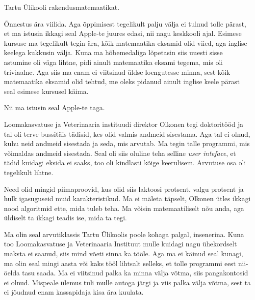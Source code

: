 
Tartu Ülikooli rakendusmatemaatikat. 


Õnnestus ära viilida. Aga õppimisest tegelikult palju välja ei tulnud 
tolle pärast, et ma istusin ikkagi seal Apple-te juures edasi, nii nagu 
keskkooli ajal. Esimese kursuse ma tegelikult tegin ära, kõik matemaatika 
eksamid olid viied, aga inglise keelega kukkusin välja. Kuna ma hõbemedaliga 
lõpetasin  siis uuesti sisse astumine oli väga lihtne, pidi ainult matemaatika 
eksami tegema, mis oli triviaalne. Aga siis ma enam ei viitsinud üldse 
loengutesse minna, sest  kõik matemaatika eksamid olid tehtud, me oleks pidanud 
ainult inglise keele pärast seal esimese kursusel käima.

Nii ma istusin seal Apple-te taga. 

Loomakasvatuse ja Veterinaaria instituudi direktor Olkonen tegi 
doktoritööd ja tal oli terve bussitäis tädisid, kes olid valmis andmeid 
sisestama. Aga tal ei olnud, kuhu neid andmeid sisestada ja seda, mis arvutab. 
Ma tegin talle  programmi, mis võimaldas andmeid sisestada. Seal oli siis 
oluline teha selline \emph{user inteface}, et tädid kuidagi eksida ei 
saaks, too oli kindlasti kõige keerulisem. Arvutuse osa oli  tegelikult 
lihtne.


Need olid mingid piimaproovid, kus olid siis laktoosi protsent, valgu protsent ja hulk 
igasuguseid muid karakteristikud.  Ma ei mäleta täpselt, Olkonen ütles ikkagi 
nood algoritmid ette, mida tuleb teha. Ma võisin matemaatiliselt nõu anda, aga  
üldiselt ta ikkagi teadis ise, mida ta tegi. 


Ma olin seal arvutiklassis Tartu Ülikoolis poole kohaga palgal,  insenerina. 
Kuna too Loomakasvatuse ja Veterinaaria Instituut mulle kuidagi nagu 
ühekordselt maksta ei saanud, siis mind võeti sinna ka tööle. Aga ma ei käinud 
seal kunagi, ma olin seal mingi aasta või kaks tööl lihtsalt selleks, et tolle 
programmi eest nii-öelda tasu saada. Ma ei viitsinud palka ka minna välja 
võtma,  siis pangakontosid ei olnud. Mispeale ülemus tuli mulle autoga järgi ja 
viis palka välja võtma, sest ta ei jõudnud enam  kassapidaja kisa ära 
kuulata.

